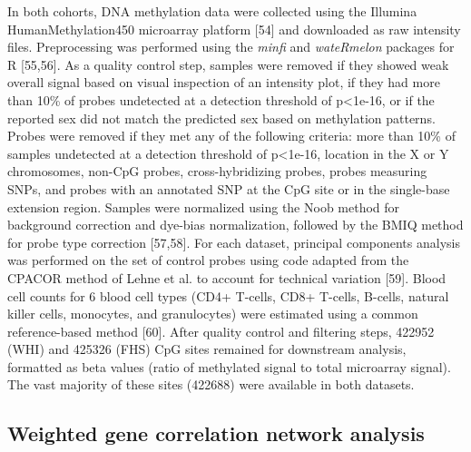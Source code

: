 \documentclass[]{bmcart}
\begin{document}
In both cohorts, DNA methylation data were collected using the Illumina
HumanMethylation450 microarray platform {[}54{]} and downloaded as raw
intensity files. Preprocessing was performed using the \emph{minfi} and
\emph{wateRmelon} packages for R {[}55,56{]}. As a quality control step,
samples were removed if they showed weak overall signal based on visual
inspection of an intensity plot, if they had more than 10\% of probes
undetected at a detection threshold of p\textless{}1e-16, or if the
reported sex did not match the predicted sex based on methylation
patterns. Probes were removed if they met any of the following criteria:
more than 10\% of samples undetected at a detection threshold of
p\textless{}1e-16, location in the X or Y chromosomes, non-CpG probes,
cross-hybridizing probes, probes measuring SNPs, and probes with an
annotated SNP at the CpG site or in the single-base extension region.
Samples were normalized using the Noob method for background correction
and dye-bias normalization, followed by the BMIQ method for probe type
correction {[}57,58{]}. For each dataset, principal components analysis
was performed on the set of control probes using code adapted from the
CPACOR method of Lehne et al. to account for technical variation
{[}59{]}. Blood cell counts for 6 blood cell types (CD4+ T-cells, CD8+
T-cells, B-cells, natural killer cells, monocytes, and granulocytes)
were estimated using a common reference-based method {[}60{]}. After
quality control and filtering steps, 422952 (WHI) and 425326 (FHS) CpG
sites remained for downstream analysis, formatted as beta values (ratio
of methylated signal to total microarray signal). The vast majority of
these sites (422688) were available in both datasets.

\subsection{Weighted gene correlation network
analysis}\label{weighted-gene-correlation-network-analysis}
\end{document}
